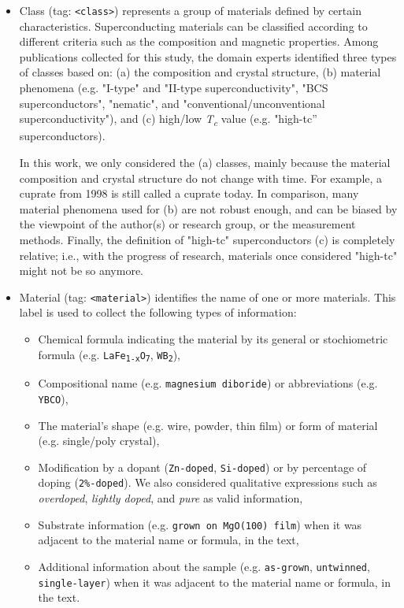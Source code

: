 \documentclass[fleqn,10pt]{wlscirep}
\begin{document}
\begin{itemize}
\item Class (tag: \texttt{<class>}) represents a group of materials defined by certain characteristics.
Superconducting materials can be classified according to different criteria such as the composition and magnetic properties. 
Among publications collected for this study, the domain experts identified three types of classes based on: (a) the composition and crystal structure, (b) material phenomena (e.g. "I-type" and "II-type superconductivity", "BCS superconductors", "nematic", and "conventional/unconventional superconductivity"), and (c) high/low \textit{T\textsubscript{c}} value (e.g. "high-tc” superconductors). 

In this work, we only considered the (a) classes, mainly because the material composition and crystal structure do not change with time. For example, a cuprate from 1998 is still called a cuprate today. 
In comparison, many material phenomena used for (b) are not robust enough, and can be biased by the viewpoint of the author(s) or research group, or the measurement methods. 
Finally, the definition of "high-tc" superconductors (c) is completely relative; i.e., with the progress of research, materials once considered "high-tc" might not be so anymore.

\item Material (tag: \texttt{<material>}) identifies the name of one or more materials. 
This label is used to collect the following types of information: 
\begin{itemize}
    \item Chemical formula indicating the material by its general or stochiometric formula (e.g. \texttt{LaFe\textsubscript{1-x}O\textsubscript{7}}, \texttt{WB\textsubscript{2}}),
    \item Compositional name (e.g. \texttt{magnesium diboride}) or abbreviations (e.g. \texttt{YBCO}), 
    \item The material's shape (e.g. wire, powder, thin film) or form of material (e.g. single/poly crystal), 
    \item Modification by a dopant (\texttt{Zn-doped}, \texttt{Si-doped}) or by percentage of doping (\texttt{2\%-doped}). We also considered qualitative expressions such as \textit{overdoped}, \textit{lightly doped}, and \textit{pure} as valid information, 
    \item Substrate information (e.g. \texttt{grown on MgO(100) film}) when it was adjacent to the material name or formula, in the text,
    \item Additional information about the sample (e.g. \texttt{as-grown}, \texttt{untwinned}, \texttt{single-layer}) when it was adjacent to the material name or formula, in the text. 
\end{itemize}


\end{itemize}
\end{document}
